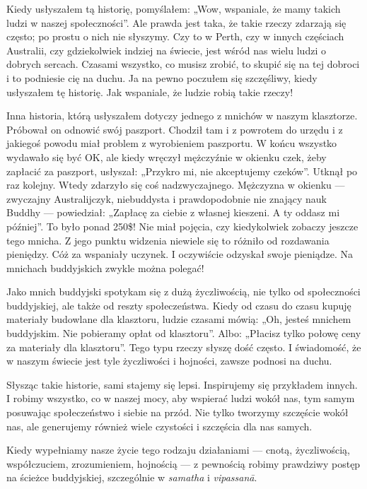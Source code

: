 \documentclass[12pt,openany]{book}
\begin{document}
Kiedy usłyszałem tą historię, pomyślałem: „Wow, wspaniale, że mamy takich ludzi w naszej społeczności”. Ale prawda jest taka, że takie rzeczy zdarzają się często; po prostu o nich nie słyszymy. Czy to w Perth, czy w innych częściach Australii, czy gdziekolwiek indziej na świecie, jest wśród nas wielu ludzi o dobrych sercach. Czasami wszystko, co musisz zrobić, to skupić się na tej dobroci i to podniesie cię na duchu. Ja na pewno poczułem się szczęśliwy, kiedy usłyszałem tę historię. Jak wspaniale, że ludzie robią takie rzeczy!

Inna historia, którą usłyszałem dotyczy jednego z mnichów w naszym klasztorze. Próbował on odnowić swój paszport. Chodził tam i z powrotem do urzędu i z jakiegoś powodu miał problem z wyrobieniem paszportu. W końcu wszystko wydawało się być OK, ale kiedy wręczył mężczyźnie w okienku czek, żeby zapłacić za paszport, usłyszał: „Przykro mi, nie akceptujemy czeków”. Utknął po raz kolejny. Wtedy zdarzyło się coś nadzwyczajnego. Mężczyzna w okienku --- zwyczajny Australijczyk, niebuddysta i prawdopodobnie nie znający nauk Buddhy --- powiedział: „Zapłacę za ciebie z własnej kieszeni. A ty oddasz mi później”. To było ponad 250\$! Nie miał pojęcia, czy kiedykolwiek zobaczy jeszcze tego mnicha. Z jego punktu widzenia niewiele się to różniło od rozdawania pieniędzy. Cóż za wspaniały uczynek. I oczywiście odzyskał swoje pieniądze. Na mnichach buddyjskich zwykle można polegać!

Jako mnich buddyjski spotykam się z dużą życzliwością, nie tylko od społeczności buddyjskiej, ale także od reszty społeczeństwa. Kiedy od czasu do czasu kupuję materiały budowlane dla klasztoru, ludzie czasami mówią: „Oh, jesteś mnichem buddyjskim. Nie pobieramy opłat od klasztoru”. Albo: „Płacisz tylko połowę ceny za materiały dla klasztoru”. Tego typu rzeczy słyszę dość często. I świadomość, że w naszym świecie jest tyle życzliwości i hojności, zawsze podnosi na duchu. 

Słysząc takie historie, sami stajemy się lepsi. Inspirujemy się przykładem innych. I robimy wszystko, co w naszej mocy, aby wspierać ludzi wokół nas, tym samym posuwając społeczeństwo i siebie na przód. Nie tylko tworzymy szczęście wokół nas, ale generujemy również wiele czystości i szczęścia dla nas samych.

Kiedy wypełniamy nasze życie tego rodzaju działaniami --- \linebreak cnotą, życzliwością, współczuciem, zrozumieniem, hojnością --- z pewnością robimy prawdziwy postęp na ścieżce buddyjskiej, \linebreak szczególnie w \textit{samatha} i \textit{vipassanā}.
\end{document}
